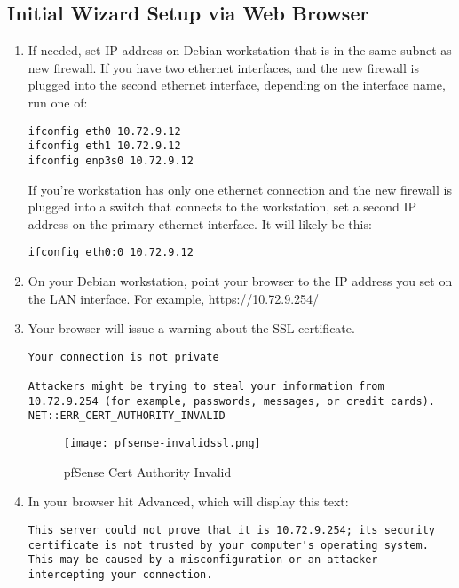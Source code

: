 \subsection{Initial Wizard Setup via Web Browser}

\begin{enumerate}
 \item If needed, set IP address on Debian workstation that is in the same subnet as new firewall. If you have two ethernet interfaces, and the new firewall is plugged into the second ethernet interface, depending on the interface name, run one of:
\begin{verbatim}
ifconfig eth0 10.72.9.12
ifconfig eth1 10.72.9.12
ifconfig enp3s0 10.72.9.12
\end{verbatim}

If you're workstation has only one ethernet connection and the new firewall is plugged into a switch that connects to the workstation, set a second IP address on the primary ethernet interface. It will likely be this:
\begin{verbatim}
ifconfig eth0:0 10.72.9.12
\end{verbatim}

 \item On your Debian workstation, point your browser to the IP address you set on the LAN interface. For example, https://10.72.9.254/
 \item Your browser will issue a warning about the SSL certificate.

\begin{verbatim}
Your connection is not private

Attackers might be trying to steal your information from 10.72.9.254 (for example, passwords, messages, or credit cards). NET::ERR_CERT_AUTHORITY_INVALID
\end{verbatim}

\begin{figure}[h!]
\begin{center}
\texttt{[image: pfsense-invalidssl.png]}
 \caption{pfSense Cert Authority Invalid}
 \label{fig:pfsense-invalidssl}
\end{center}
\end{figure}

 \item In your browser hit Advanced, which will display this text:
\begin{verbatim}
This server could not prove that it is 10.72.9.254; its security certificate is not trusted by your computer's operating system. This may be caused by a misconfiguration or an attacker intercepting your connection.


\end{verbatim}
\end{enumerate}
